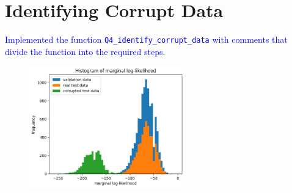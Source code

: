 \documentclass[a4 paper]{article}
\begin{document}
\section{Identifying Corrupt Data}

\textcolor{blue}{
    Implemented the function \texttt{Q4\_identify\_corrupt\_data} with comments that divide the function into the required steps.
}


\begin{figure}[H]
    \centering
    \includegraphics[width=0.6\textwidth]{../plots/Q4_hist.png}
\end{figure}
\end{document}
